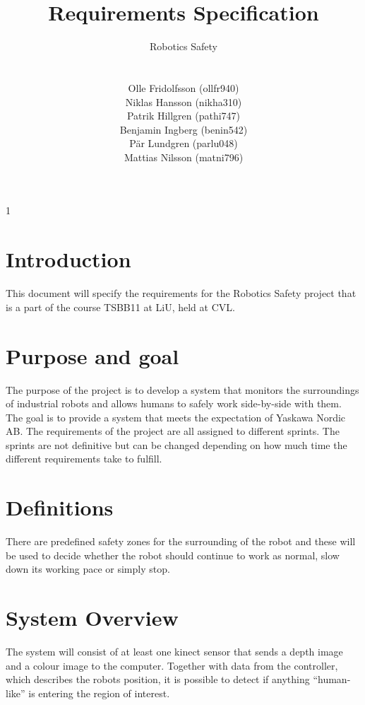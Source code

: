 1\documentclass[10pt,a4paper]{article}
\title{Requirements Specification}
\author{\begin{large}{Robotics Safety}\end{large}\\\\
Olle Fridolfsson (ollfr940) \\  Niklas Hansson (nikha310) \\ Patrik Hillgren (pathi747) \\ Benjamin Ingberg (benin542)\\ Pär Lundgren (parlu048) \\ Mattias Nilsson (matni796)}
\begin{document}
\maketitle
\newpage
\tableofcontents
\newpage
\noindent %
\section{Introduction}
This document will specify the requirements for the Robotics Safety project that is a part of the course TSBB11 at LiU, held at CVL.
\section{Purpose and goal}
The purpose of the project is to develop a system that monitors the surroundings of industrial robots and allows humans to safely work side-by-side with them. 
The goal is to provide a system that meets the expectation of Yaskawa Nordic AB.
The requirements of the project are all assigned to different sprints. The sprints are not definitive but can be changed depending on how much time the different requirements take to fulfill. 

\section{Definitions}
There are predefined safety zones for the surrounding of the robot and these will be used to decide whether the robot should continue to work as normal, slow down its working pace or simply stop.

\section{System Overview}
The system will consist of at least one kinect sensor that sends a depth image and a colour image to the computer. Together with data from the controller, which describes the robots position, it is possible to detect if anything “human-like” is entering the region of interest.
\end{document}

